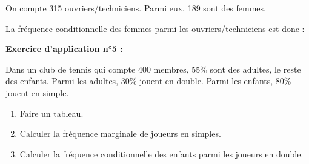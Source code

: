 \documentclass[12pt]{article}
\begin{document}
\vspace{5pt}

On compte 315 ouvriers/techniciens. Parmi eux, 189 sont des femmes.
\vspace{5pt}

La fréquence conditionnelle des femmes parmi les ouvriers/techniciens est donc :
\vspace{1.7cm}


\begin{mdframed}[
    linewidth=1pt,
    roundcorner=5pt,
    linecolor=RoyalBlue,
    innerbottommargin=2pt
]
{\color{RoyalBlue}\textbf{Exercice d'application n°5 :}}
\vspace{5pt}

Dans un club de tennis qui compte 400 membres, 55\% sont des adultes, le reste des enfants. 
Parmi les adultes, 
30\% jouent en double.
Parmi les enfants, 80\% jouent en simple.
\begin{enumerate}
    \item Faire un tableau.
    \item Calculer la fréquence marginale de joueurs en simples.
    \item Calculer la fréquence conditionnelle des enfants parmi les joueurs en double.
\end{enumerate}
\end{mdframed}

\vspace{10pt}
\end{document}
